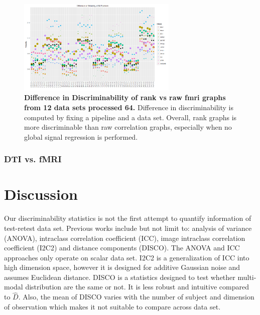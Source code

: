 \documentclass{article}
\begin{document}
\begin{figure}[t!]
	\includegraphics[width=3.0in]{../Figs/64_pipelines_differ.png}
	\caption{{\bf Difference in Discriminability of rank vs raw fmri graphs from 12 data sets processed 64.} Difference in discriminability is computed by fixing a pipeline and a data set. Overall, rank graphs is more discriminable than raw correlation graphs, especially when no global signal regression is performed. }
	\label{fig:9}
\end{figure}




\subsubsection{DTI vs. fMRI}










\section{Discussion}


Our discriminability statistics is not the first attempt to quantify information of test-retest data set. Previous works include but not limit to: analysis of variance (ANOVA), intraclass correlation coefficient (ICC), image intraclass correlation coefficient (I2C2) and distance components (DISCO). The ANOVA and ICC approaches only operate on scalar data set. I2C2 is a generalization of ICC into high dimension space, however it is designed for additive Gaussian noise and assumes Euclidean distance. DISCO is a statistics designed to test whether multi-modal distribution are the same or not. It is less robust and intuitive compared to $\hat{D}$. Also, the mean of DISCO varies with the number of subject and dimension of observation which makes it not suitable to compare across data set.




% 
% 
% 
% 
% 
% 
% 
% 



\appendix






\newpage
\small{


}
\end{document}
